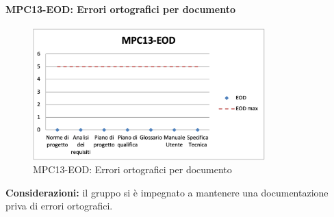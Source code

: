 \paragraph{MPC13-EOD: Errori ortografici per documento}
\begin{figure}[h!] 
    \centering
    \includegraphics[width=0.8\textwidth]{images/MPC13-EOD.png}
    \caption{MPC13-EOD: Errori ortografici per documento}
\end{figure}
\noindent \textbf{Considerazioni:} il gruppo si è impegnato a mantenere una documentazione priva di errori ortografici.


